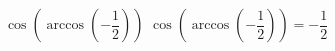  {$\cos\left(\arccos\left(-\dfrac{1}{2}\right)\right)$}
{ $\cos\left(\arccos\left(-\dfrac{1}{2}\right)\right) = -\dfrac{1}{2}$}
